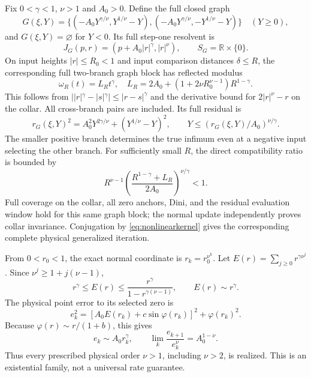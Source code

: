 \documentclass[11pt]{article}
\theoremstyle{remark}
\begin{document}
Fix $0<\gamma<1$, $\nu>1$ and $A_0>0$. Define the full closed graph
\begin{equation}\label{eq:doublegraph}
 G(\xi,Y)=
 \{(-A_0Y^{\gamma/\nu},Y^{1/\nu}-Y),
    (-A_0Y^{\gamma/\nu},-Y^{1/\nu}-Y)\}\quad(Y\ge0),
\end{equation}
and $G(\xi,Y)=\varnothing$ for $Y<0$. Its full step-one resolvent is
\begin{equation}\label{eq:doubleprox}
 J_G(p,r)=(p+A_0|r|^\gamma,|r|^\nu),\qquad S_G=\mathbb R\times\{0\}.
\end{equation}
On input heights $|r|\le R_0<1$ and input comparison distances $\delta\le R$,
the corresponding full two-branch graph block has reflected modulus
\begin{equation}
 \omega_R(t)=L_Rt^\gamma,\quad
 L_R=2A_0+(1+2\nu R_0^{\nu-1})R^{1-\gamma}.
\end{equation}
This follows from $||r|^\gamma-|s|^\gamma|\le|r-s|^\gamma$
and the derivative bound for $2|r|^\nu-r$ on the collar. All cross-branch
pairs are included. Its full residual is
\begin{equation}
 r_G(\xi,Y)^2=A_0^2Y^{2\gamma/\nu}+(Y^{1/\nu}-Y)^2,
 \qquad Y\le(r_G(\xi,Y)/A_0)^{\nu/\gamma}.
\end{equation}
The smaller positive branch determines the true infimum even at a
negative input selecting the other branch. For sufficiently small $R$,
the direct compatibility ratio is bounded by
\begin{equation}
 R^{\nu-1}\left(\frac{R^{1-\gamma}+L_R}{2A_0}\right)^{\nu/\gamma}<1.
\end{equation}
Full coverage on the collar, all zero anchors, Dini, and the residual
evaluation window hold for this same graph block; the normal update
independently proves collar invariance. Conjugation by
\eqref{eq:nonlinearkernel} gives the corresponding complete physical
generalized iteration.

From $0<r_0<1$, the exact normal coordinate is $r_k=r_0^{\nu^k}$.
Let $E(r)=\sum_{j\ge0}r^{\gamma\nu^j}$. Since
$\nu^j\ge1+j(\nu-1)$,
\begin{equation}
 r^\gamma\le E(r)\le
 \frac{r^\gamma}{1-r^{\gamma(\nu-1)}},\qquad E(r)\sim r^\gamma.
\end{equation}
The physical point error to its selected zero is
\begin{equation}
 e_k^2=[A_0E(r_k)+c\sin\varphi(r_k)]^2+\varphi(r_k)^2.
\end{equation}
Because $\varphi(r)\sim r/(1+b)$, this gives
\begin{equation}\label{eq:qorder}
 e_k\sim A_0r_k^\gamma,\qquad
 \lim_k\frac{e_{k+1}}{e_k^\nu}=A_0^{1-\nu}.
\end{equation}
Thus every prescribed physical order $\nu>1$, including $\nu>2$, is
realized. This is an existential family, not a universal rate guarantee.
\end{document}
